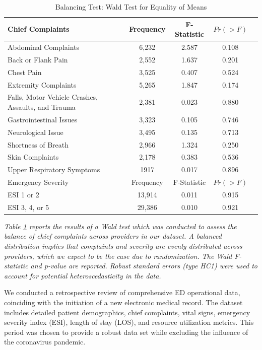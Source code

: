 \documentclass{article}
\begin{document}
\begin{table}[htbp]
    \centering
    \caption{Balancing Test: Wald Test for Equality of Means}
    \label{tab:wald_test}
    \begin{tabular}{p{10cm}cccc}
        \toprule
        Chief Complaints & Frequency & F-Statistic & $Pr(> F)$ \\
        \midrule
        Abdominal Complaints & 6,232 & 2.587 & 0.108 \\ 
        Back or Flank Pain & 2,552 & 1.637 & 0.201 \\ 
        Chest Pain & 3,525 & 0.407 & 0.524 \\ 
        Extremity Complaints & 5,265 & 1.847 & 0.174 \\ 
        Falls, Motor Vehicle Crashes, Assaults, and Trauma & 2,381 & 0.023 & 0.880 \\ 
        Gastrointestinal Issues & 3,323 & 0.105 & 0.746 \\ 
        Neurological Issue & 3,495 & 0.135 & 0.713 \\ 
        Shortness of Breath & 2,966 & 1.324 & 0.250 \\ 
        Skin Complaints & 2,178 & 0.383 & 0.536 \\ 
        Upper Respiratory Symptoms & 1917 & 0.017 & 0.896 \\ 
        \midrule
        Emergency Severity & Frequency & F-Statistic & $Pr(> F)$ \\
        \midrule
        ESI 1 or 2 & 13,914 & 0.011 & 0.915 \\ 
        ESI 3, 4, or 5 & 29,386 & 0.010 & 0.921 \\ 
        \bottomrule
    \end{tabular}
\begin{tablenotes}
\small
\item \textit{Table \ref{tab:wald_test} reports the results of a Wald test which was conducted to assess the balance of chief complaints across providers in our dataset. A balanced distribution implies that complaints and severity are evenly distributed across providers, which we expect to be the case due to randomization. The Wald F-statistic and p-value are reported. Robust standard errors (type HC1) were used to account for potential heteroscedasticity in the data.}
\end{tablenotes}
\end{table}

We conducted a retrospective review of comprehensive ED operational
data, coinciding with the initiation of a new electronic medical record.
The dataset includes detailed patient demographics, chief complaints,
vital signs, emergency severity index (ESI), length of stay (LOS), and
resource utilization metrics. This period was chosen to provide a robust
data set while excluding the influence of the coronavirus pandemic.
\end{document}
